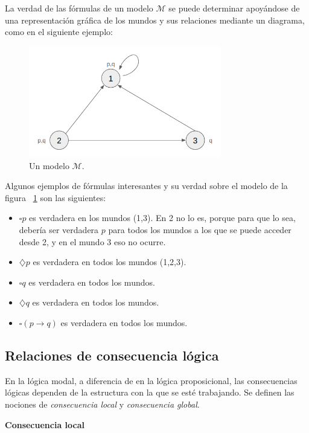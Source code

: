 La verdad de las fórmulas de un modelo $\mathcal{M}$ se puede determinar apoyándose de una representación gráfica de los mundos y sus relaciones mediante un diagrama, como en el siguiente ejemplo:

\begin{figure}[h]
    \centering
    \includegraphics[width=0.75\textwidth]{images/maths/lmodal1.png}
    \caption{Un modelo $\mathcal{M}$.}
    \label{fig:lmodalimg1}
\end{figure}

Algunos ejemplos de fórmulas interesantes y su verdad sobre el modelo de la figura ~\ref{fig:lmodalimg1} son las siguientes:
\begin{itemize}
    \item $\square p $ es verdadera en los mundos (1,3). En 2 no lo es, porque para que lo sea, debería ser verdadera $p$ para todos los mundos a los que se puede acceder desde 2, y en el mundo 3 eso no ocurre.
    \item $\diamondsuit p$ es verdadera en todos los mundos (1,2,3).
    \item $\square q$ es verdadera en todos los mundos.
    \item $\diamondsuit q$ es verdadera en todos los mundos.
    \item $\square(p \rightarrow q)$ es verdadera en todos los mundos.
\end{itemize}

\subsection{Relaciones de consecuencia lógica}\label{subsection:lmodalconsec}
En la lógica modal, a diferencia de en la lógica proposicional, las consecuencias lógicas dependen de la estructura con la que se esté trabajando. Se definen las nociones de \textit{consecuencia local} y \textit{consecuencia global}.

\vspace{0.5cm}
\noindent
\textbf{Consecuencia local}

